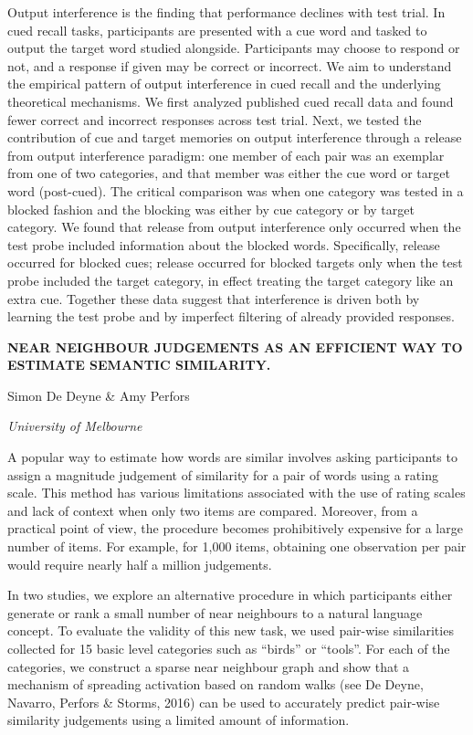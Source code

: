 \documentclass[]{article}
\begin{document}
Output interference is the finding that performance declines with test
trial. In cued recall tasks, participants are presented with a cue word
and tasked to output the target word studied alongside. Participants may
choose to respond or not, and a response if given may be correct or
incorrect. We aim to understand the empirical pattern of output
interference in cued recall and the underlying theoretical mechanisms.
We first analyzed published cued recall data and found fewer correct and
incorrect responses across test trial. Next, we tested the contribution
of cue and target memories on output interference through a release from
output interference paradigm: one member of each pair was an exemplar
from one of two categories, and that member was either the cue word or
target word (post-cued). The critical comparison was when one category
was tested in a blocked fashion and the blocking was either by cue
category or by target category. We found that release from output
interference only occurred when the test probe included information
about the blocked words. Specifically, release occurred for blocked
cues; release occurred for blocked targets only when the test probe
included the target category, in effect treating the target category
like an extra cue. Together these data suggest that interference is
driven both by learning the test probe and by imperfect filtering of
already provided responses.

\textbf{NEAR NEIGHBOUR JUDGEMENTS AS AN EFFICIENT WAY TO ESTIMATE
SEMANTIC SIMILARITY.}

Simon De Deyne \& Amy Perfors

\emph{University of Melbourne}

A popular way to estimate how words are similar involves asking
participants to assign a magnitude judgement of similarity for a pair of
words using a rating scale. This method has various limitations
associated with the use of rating scales and lack of context when only
two items are compared. Moreover, from a practical point of view, the
procedure becomes prohibitively expensive for a large number of items.
For example, for 1,000 items, obtaining one observation per pair would
require nearly half a million judgements.

In two studies, we explore an alternative procedure in which
participants either generate or rank a small number of near neighbours
to a natural language concept. To evaluate the validity of this new
task, we used pair-wise similarities collected for 15 basic level
categories such as ``birds'' or ``tools''. For each of the categories,
we construct a sparse near neighbour graph and show that a mechanism of
spreading activation based on random walks (see De Deyne, Navarro,
Perfors \& Storms, 2016) can be used to accurately predict pair-wise
similarity judgements using a limited amount of information.
\end{document}
